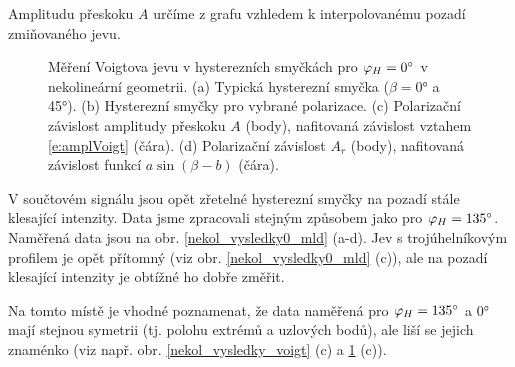 Amplitudu přeskoku $A$ určíme z grafu vzhledem k interpolovanému pozadí zmiňovaného jevu.


\begin{figure}[htbp]\centering
{}
	\caption{Měření Voigtova jevu v hysterezních smyčkách pro $\varphi_H=\ang{0}$ v nekolineární geometrii. (a) Typická hysterezní smyčka ($\beta=\ang{0}$ a \ang{45}). (b) Hysterezní smyčky pro vybrané polarizace. (c) Polarizační závislost amplitudy přeskoku $A$ (body), nafitovaná závislost vztahem \eqref{e:amplVoigt} (čára). (d) Polarizační závislost $A_r$ (body), nafitovaná závislost funkcí $a\sin(\beta-b)$ (čára).}\label{nekol_vysledky0_voigt}
\end{figure}

V součtovém signálu jsou opět zřetelné hysterezní smyčky na pozadí stále klesající intenzity. Data jsme zpracovali stejným způsobem jako pro $\varphi_H=\ang{135}$. Naměřená data jsou na obr. \ref{nekol_vysledky0_mld} (a-d). Jev s trojúhelníkovým profilem je opět přítomný (viz obr. \ref{nekol_vysledky0_mld} (c)), ale na pozadí klesající intenzity je obtížné ho dobře změřit.

Na tomto místě je vhodné poznamenat, že data naměřená pro $\varphi_H=\ang{135}$ a \ang{0} mají stejnou symetrii (tj. polohu extrémů a uzlových bodů), ale liší se jejich znaménko (viz např. obr. \ref{nekol_vysledky_voigt} (c) a \ref{nekol_vysledky0_voigt} (c)).

